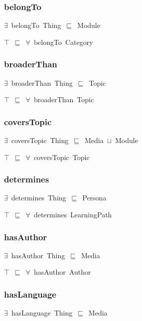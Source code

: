 \documentclass{article}
\begin{document}
\subsubsection*{belongTo}

\ensuremath{\exists}~belongTo~Thing~\ensuremath{\sqsubseteq}~Module

\ensuremath{\top}~\ensuremath{\sqsubseteq}~\ensuremath{\forall}~belongTo~Category

\subsubsection*{broaderThan}

\ensuremath{\exists}~broaderThan~Thing~\ensuremath{\sqsubseteq}~Topic

\ensuremath{\top}~\ensuremath{\sqsubseteq}~\ensuremath{\forall}~broaderThan~Topic

\subsubsection*{coversTopic}

\ensuremath{\exists}~coversTopic~Thing~\ensuremath{\sqsubseteq}~Media~\ensuremath{\sqcup}~Module

\ensuremath{\top}~\ensuremath{\sqsubseteq}~\ensuremath{\forall}~coversTopic~Topic

\subsubsection*{determines}

\ensuremath{\exists}~determines~Thing~\ensuremath{\sqsubseteq}~Persona

\ensuremath{\top}~\ensuremath{\sqsubseteq}~\ensuremath{\forall}~determines~LearningPath

\subsubsection*{hasAuthor}

\ensuremath{\exists}~hasAuthor~Thing~\ensuremath{\sqsubseteq}~Media

\ensuremath{\top}~\ensuremath{\sqsubseteq}~\ensuremath{\forall}~hasAuthor~Author

\subsubsection*{hasLanguage}

\ensuremath{\exists}~hasLanguage~Thing~\ensuremath{\sqsubseteq}~Media
\end{document}
